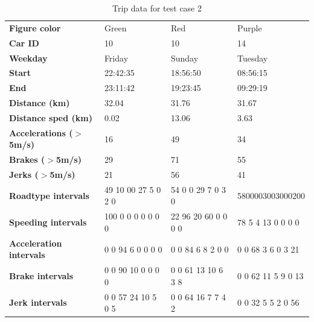 \begin{table}
    \begin{tabular}{>{\bfseries}l|lll|}
    Figure color            & Green                & Red                 & Purple             \\
    Car ID                  & 10                   & 10                  & 14                 \\
    Weekday                 & Friday               & Sunday              & Tuesday            \\
    Start                   & 22:42:35             & 18:56:50            & 08:56:15           \\
    End                     & 23:11:42             & 19:23:45            & 09:29:19           \\
    Distance (km)           & 32.04                & 31.76               & 31.67              \\
    Distance sped (km)      & 0.02                 & 13.06               & 3.63               \\
    Accelerations ($>$5m/s) & 16                   & 49                  & 34                 \\
    Brakes ($>$5m/s)        & 29                   & 71                  & 55                 \\
    Jerks ($>$5m/s)         & 21                   & 56                  & 41                 \\
    Roadtype intervals      & 49 10 00 27 5  0 2 0 & 54 0 0 29 7 0 3 0   & 5800003003000200   \\
    Speeding intervals      & 100 0 0 0 0 0 0 0    & 22 96 20 60 0 0 0 0 & 78 5 4 13 0 0 0 0  \\
    Acceleration intervals  & 0 0 94 6 0 0 0 0     & 0 0 84 6 8 2 0 0    & 0 0 68 3 6 0 3 21  \\
    Brake intervals         & 0 0 90 10 0 0 0 0    & 0 0 61 13 10 6 3 8  & 0 0 62 11 5 9 0 13 \\
    Jerk intervals          & 0 0 57 24 10 5 0 5   & 0 0 64 16 7 7 4 2   & 0 0 32 5 5 2 0 56  \\
    \end{tabular}
    \caption{Trip data for test case 2}
    \label{tab:longtrips}
\end{table}


